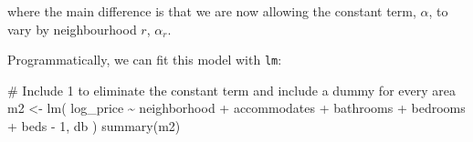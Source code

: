 \documentclass[
  letterpaper,
  DIV=11,
  numbers=noendperiod,
  oneside]{scrreprt}
\newenvironment{Shaded}{\begin{snugshade}}{\end{snugshade}}
\newcommand{\CommentTok}[1]{\textcolor[rgb]{0.37,0.37,0.37}{#1}}
\newcommand{\FunctionTok}[1]{\textcolor[rgb]{0.28,0.35,0.67}{#1}}
\newcommand{\NormalTok}[1]{\textcolor[rgb]{0.00,0.23,0.31}{#1}}
\newcommand{\OtherTok}[1]{\textcolor[rgb]{0.00,0.23,0.31}{#1}}
\newcommand{\StringTok}[1]{\textcolor[rgb]{0.13,0.47,0.30}{#1}}
\begin{document}
where the main difference is that we are now allowing the constant term,
\(\alpha\), to vary by neighbourhood \(r\), \(\alpha_r\).

Programmatically, we can fit this model with \texttt{lm}:

\begin{Shaded}
\begin{Highlighting}[]
\CommentTok{\# Include \textasciigrave{}{-}1\textasciigrave{} to eliminate the constant term and include a dummy for every area}
\NormalTok{m2 }\OtherTok{\textless{}{-}} \FunctionTok{lm}\NormalTok{(}
  \StringTok{\textquotesingle{}log\_price \textasciitilde{} neighborhood + accommodates + bathrooms + bedrooms + beds {-} 1\textquotesingle{}}\NormalTok{, }
\NormalTok{  db}
\NormalTok{)}
\FunctionTok{summary}\NormalTok{(m2)}
\end{Highlighting}
\end{Shaded}
\end{document}
